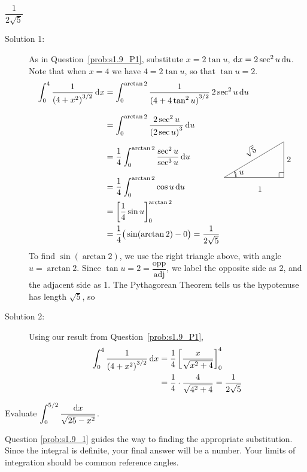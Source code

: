 \begin{answer}
$ \dfrac{1}{2\sqrt{5}}$
\end{answer}

\begin{solution}
\begin{description}
\item[Solution 1:]
As in Question~\ref{prob:s1.9_P1}, substitute $x=2\tan u$,  $\mathrm{d}x=2 \sec^2u\,\mathrm{d}u$. Note that when $x=4$
we have $4=2\tan u$, so that $\tan u=2$.
\begin{align*}
\int_0^4 \frac{1}{{(4+x^2)}^{3/2}}\,\dee{x}
&=\int_0^{\arctan 2} \frac{1}{{(4+4\tan^2 u)}^{3/2}}\,2\sec^2 u\,\dee{u}
   \\[0.1in]
&=\int_0^{\arctan 2} \frac{2\sec^2 u}{{(2\sec u)}^{3}}\,\dee{u}
   \\[0.1in]
&=\frac{1}{4}\int_0^{\arctan 2} \frac{\sec^2u}{\sec^3u}\,\dee{u}\\[0.1in]
&=\frac{1}{4}\int_0^{\arctan 2} \cos u\,\dee{u}
\qquad\qquad\smash{\raisebox{-0.1\height}{
\trigtri{u}{1}{2}{\sqrt{5}}
}}
\\
&=\bigg[\frac{1}{4}\sin u \bigg]_0^{\arctan2}
\\
&=\frac{1}{4} \big( \sin(\arctan 2) - 0 \big)
= \frac{1}{2\sqrt{5}}
\end{align*}
To find $\sin(\arctan 2)$, we use the right triangle above, with angle $u=\arctan 2$. Since $\tan u=2 = \dfrac{\mbox{opp}}{\mbox{adj}}$, we label the opposite side as 2, and the adjacent side as 1. The Pythagorean Theorem tells us the hypotenuse has length $\sqrt{5}$, so 

\item[Solution 2:]
Using our result from Question~\ref{prob:s1.9_P1},
\begin{align*}
\int_0^4 \frac{1}{{(4+x^2)}^{3/2}}\,\mathrm{d}x&=\frac{1}{4}\left[ \dfrac x{\sqrt{x^2+4}}\right]_0^4\\
&=\frac{1}{4}\cdot \dfrac{4}{\sqrt{4^2+4}}=\frac{1}{2\sqrt{5}}
\end{align*}
\end{description}
\end{solution}


\begin{Mquestion}[M105 2013A]
Evaluate $\displaystyle\int_0^{5/2} \frac{\mathrm{d}x}{\sqrt{25-x^2}}$.
\end{Mquestion}

\begin{hint}
Question \ref{prob:s1.9_1} guides the way to finding the appropriate substitution.
Since the integral is definite, your final answer will be a number. Your limits of integration should be common reference angles.
\end{hint}

